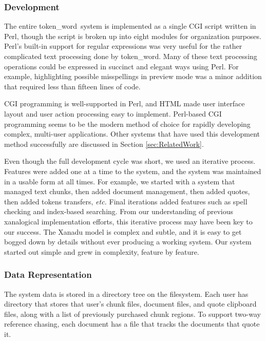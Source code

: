 \documentclass{acm_proc_article-sp}
\newcommand{\tw}{token\_word}
\begin{document}
\subsubsection{Development}
The entire \tw \  system is implemented as a single CGI script written in Perl, though the script is broken up into eight modules for organization purposes.
Perl's built-in support for regular expressions was very useful for the rather complicated text processing done by \tw.
Many of these text processing operations could be expressed in succinct and elegant ways using Perl.
For example, highlighting possible misspellings in preview mode was a minor addition that required less than fifteen lines of code.

CGI programming is well-supported in Perl, and HTML made user interface layout and user action processing easy to implement.
Perl-based CGI programming seems to be the modern method of choice for rapidly developing complex, multi-user applications.
Other systems that have used this development method successfully are discussed in Section \ref{sec:RelatedWork}.

Even though the full development cycle was short, we used an iterative process.
Features were added one at a time to the system, and the system was maintained in a usable form at all times.
For example, we started with a system that managed text chunks, then added document management, then added quotes, then added tokens transfers, {\it etc.}
Final iterations added features such as spell checking and index-based searching.
From our understanding of previous xanalogical implementation efforts, this iterative process may have been key to our success.
The Xanadu model is complex and subtle, and it is easy to get bogged down by details without ever producing a working system.
Our system started out simple and grew in complexity, feature by feature.


\subsubsection{Data Representation}
The system data is stored in a directory tree on the filesystem.
Each user has directory that stores that user's chunk files, document files, and quote clipboard files, along with a list of previously purchased chunk regions.
To support two-way reference chasing, each document has a file that tracks the documents that quote it.
\end{document}
